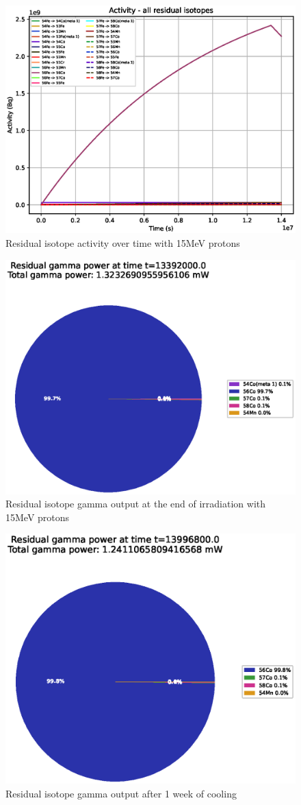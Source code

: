 \begin{figure}[!htb]
\centering
\includegraphics[width=0.7\linewidth]{chapters/activity_code/fe_100dpa/by_isotope/15MeV_all_radioactive_isotopes.eps}
\caption{Residual isotope activity over time with 15MeV protons}
\label{fig:15mev-proton-100dpa-activity}
\end{figure}

\begin{figure}[!htb]
\centering
\includegraphics[width=0.7\linewidth]{chapters/activity_code/fe_100dpa/endofbeam/15MeV_0400_13392000.eps}
\caption{Residual isotope gamma output at the end of irradiation with 15MeV protons}
\label{fig:15mev-proton-100dpa}
\end{figure}

\begin{figure}[!htb]
\centering
\includegraphics[width=0.7\linewidth]{chapters/activity_code/fe_100dpa/endofbeam/15MeV_0500_13996800.eps}
\caption{Residual isotope gamma output after 1 week of cooling}
\label{fig:15mev-proton-100dpa}
\end{figure}



